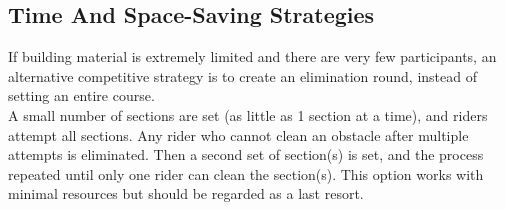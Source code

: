 \subsection{Time And Space-Saving Strategies}
If building material is extremely limited and there are very few participants, an alternative competitive strategy is to
create an elimination round, instead of setting an entire course.\\
A small number of sections are set (as little as 1 section at a time), and riders attempt all sections. Any rider who
cannot clean an obstacle after multiple attempts is eliminated. Then a second set of section(s) is set, and the process
repeated until only one rider can clean the section(s). This option works with minimal resources but should be regarded
as a last resort.